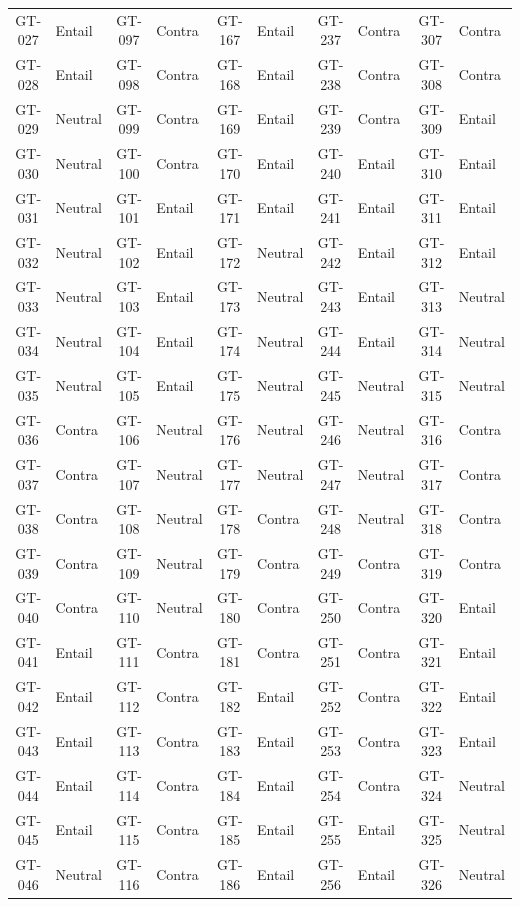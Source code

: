 \begin{longtable}{@{} c l @{\hspace{10pt}} c l @{\hspace{10pt}} c l @{\hspace{10pt}} c l @{\hspace{10pt}} c l @{}}
GT-027 & Entail & GT-097 & Contra & GT-167 & Entail & GT-237 & Contra & GT-307 & Contra \\
GT-028 & Entail & GT-098 & Contra & GT-168 & Entail & GT-238 & Contra & GT-308 & Contra \\
GT-029 & Neutral & GT-099 & Contra & GT-169 & Entail & GT-239 & Contra & GT-309 & Entail \\
GT-030 & Neutral & GT-100 & Contra & GT-170 & Entail & GT-240 & Entail & GT-310 & Entail \\
GT-031 & Neutral & GT-101 & Entail & GT-171 & Entail & GT-241 & Entail & GT-311 & Entail \\
GT-032 & Neutral & GT-102 & Entail & GT-172 & Neutral & GT-242 & Entail & GT-312 & Entail \\
GT-033 & Neutral & GT-103 & Entail & GT-173 & Neutral & GT-243 & Entail & GT-313 & Neutral \\
GT-034 & Neutral & GT-104 & Entail & GT-174 & Neutral & GT-244 & Entail & GT-314 & Neutral \\
GT-035 & Neutral & GT-105 & Entail & GT-175 & Neutral & GT-245 & Neutral & GT-315 & Neutral \\
GT-036 & Contra & GT-106 & Neutral & GT-176 & Neutral & GT-246 & Neutral & GT-316 & Contra \\
GT-037 & Contra & GT-107 & Neutral & GT-177 & Neutral & GT-247 & Neutral & GT-317 & Contra \\
GT-038 & Contra & GT-108 & Neutral & GT-178 & Contra & GT-248 & Neutral & GT-318 & Contra \\
GT-039 & Contra & GT-109 & Neutral & GT-179 & Contra & GT-249 & Contra & GT-319 & Contra \\
GT-040 & Contra & GT-110 & Neutral & GT-180 & Contra & GT-250 & Contra & GT-320 & Entail \\
GT-041 & Entail & GT-111 & Contra & GT-181 & Contra & GT-251 & Contra & GT-321 & Entail \\
GT-042 & Entail & GT-112 & Contra & GT-182 & Entail & GT-252 & Contra & GT-322 & Entail \\
GT-043 & Entail & GT-113 & Contra & GT-183 & Entail & GT-253 & Contra & GT-323 & Entail \\
GT-044 & Entail & GT-114 & Contra & GT-184 & Entail & GT-254 & Contra & GT-324 & Neutral \\
GT-045 & Entail & GT-115 & Contra & GT-185 & Entail & GT-255 & Entail & GT-325 & Neutral \\
GT-046 & Neutral & GT-116 & Contra & GT-186 & Entail & GT-256 & Entail & GT-326 & Neutral \\

\end{longtable}
